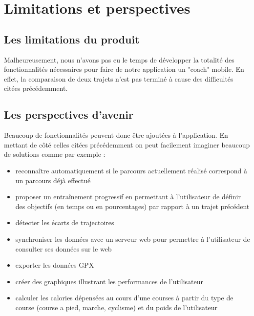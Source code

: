 \chapter{Limitations et perspectives}
\section{Les limitations du produit}
Malheureusement, nous n'avons pas eu le temps de développer la totalité des fonctionnalités nécessaires pour faire de notre application un "coach" mobile. En effet, la comparaison de deux trajets n'est pas terminé à cause des difficultés citées précédemment. 


\section{Les perspectives d'avenir}
Beaucoup de fonctionnalités peuvent donc être ajoutées à l'application. En mettant de côté celles citées précédemment on peut facilement imaginer beaucoup de solutions comme par exemple : \bigskip
\begin{itemize}
	\item reconnaître automatiquement si le parcours actuellement réalisé correspond à un parcours déjà effectué
	\item proposer un entraînement progressif en permettant à l'utilisateur de définir des objectifs (en temps ou en pourcentages) par rapport à un trajet précédent
	\item détecter les écarts de trajectoires
	\item synchroniser les données avec un serveur web pour permettre à l'utilisateur de consulter ses données sur le web
	\item exporter les données GPX
	\item créer des graphiques illustrant les performances de l'utilisateur
	\item calculer les calories dépensées au cours d'une courses à partir du type de course (course a pied, marche, cyclisme) et du poids de l'utilisateur
\end{itemize}

